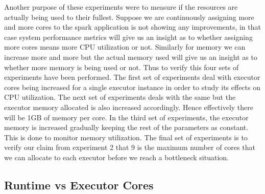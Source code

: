 \documentclass[11pt]{article}
\begin{document}
\par Another purpose of these experiments  were to measure if the resources are actually being used to their fullest. Suppose we are continuously assigning more and more cores to the spark application is not showing any improvements, in that case system performance metrics will give us an insight as to whether assigning more cores means more CPU utilization or not. Similarly for memory we can increase more and more but the actual memory used will give us an insight as to whether more memory is being used or not.
Thus to verify this  four sets of experiments have been performed. The first set of experiments deal with executor cores being increased for a single executor instance in order to study its effects on CPU utilization. The next set of experiments deals with the same but the executor memory allocated is also increased accordingly. Hence effectively there will be 1GB of memory per core. In the third set of experiments, the executor memory is increased gradually keeping the rest of the parameters as constant. This is done to monitor memory utilization. The final set of experiments is to verify our claim from experiment 2 that 9 is the maximum number of cores that we can allocate to each executor before we reach a bottleneck situation. 

\subsection{Runtime vs Executor Cores}
\end{document}

